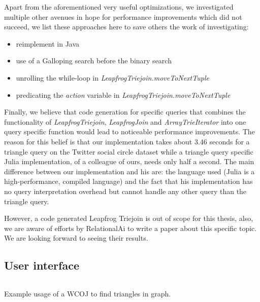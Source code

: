 Apart from the aforementioned very useful optimizations, we investigated multiple other avenues in hope for performance improvements
which did not succeed, we list these approaches here to save others the work of investigating:

\begin{itemize}
    \item reimplement in Java
    \item use of a Galloping search before the binary search
    \item unrolling the while-loop in \textit{LeapfrogTriejoin.moveToNextTuple}
    \item predicating the \textit{action} variable in \textit{LeapfrogTriejoin.moveToNextTuple}
\end{itemize}


Finally, we believe that code generation for specific queries that combines the functionality of \textit{LeapfrogTriejoin}, \textit{LeapfrogJoin}
and \textit{ArrayTrieIterator} into one query specific function would lead to noticeable performance improvements.
The reason for this belief is that our implementation takes about 3.46 seconds for a triangle query on the Twitter social circle dataset
while a triangle query specific Julia implementation, of a colleague of ours, needs only half a second.
The main difference between our implementation and his are: the language used (Julia is a high-performance, compiled language) and the fact
that his implementation has no query interpretation overhead but cannot handle any other query than the triangle query.

However, a code generated Leapfrog Triejoin is out of scope for this thesis, also, we are aware of efforts by RelationalAi to
write a paper about this specific topic.
We are looking forward to seeing their results.





\subsection{User interface}\label{subsec:user-interface}
\begin{listing}[H]
\inputminted{scala}{code/usage-example.scala}
\caption{Example usage of a WCOJ to find triangles in graph.}
\label{lst:usage-example}
\end{listing}

